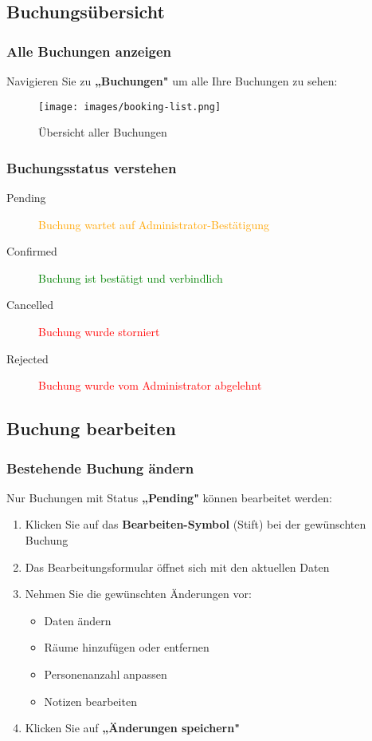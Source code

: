 \subsection{Buchungsübersicht}

\subsubsection{Alle Buchungen anzeigen}

Navigieren Sie zu \textbf{„Buchungen"} um alle Ihre Buchungen zu sehen:

\begin{figure}[H]
    \centering
    \texttt{[image: images/booking-list.png]}
    \caption{Übersicht aller Buchungen}
    \label{fig:booking-list}
\end{figure}

\subsubsection{Buchungsstatus verstehen}

\begin{description}
    \item[Pending] \textcolor{orange}{Buchung wartet auf Administrator-Bestätigung}
    \item[Confirmed] \textcolor{green}{Buchung ist bestätigt und verbindlich}
    \item[Cancelled] \textcolor{red}{Buchung wurde storniert}
    \item[Rejected] \textcolor{red}{Buchung wurde vom Administrator abgelehnt}
\end{description}

\subsection{Buchung bearbeiten}

\subsubsection{Bestehende Buchung ändern}

Nur Buchungen mit Status \textbf{„Pending"} können bearbeitet werden:

\begin{enumerate}
    \item Klicken Sie auf das \textbf{Bearbeiten-Symbol} (Stift) bei der gewünschten Buchung
    \item Das Bearbeitungsformular öffnet sich mit den aktuellen Daten
    \item Nehmen Sie die gewünschten Änderungen vor:
        \begin{itemize}
            \item Daten ändern
            \item Räume hinzufügen oder entfernen
            \item Personenanzahl anpassen
            \item Notizen bearbeiten
        \end{itemize}
    \item Klicken Sie auf \textbf{„Änderungen speichern"}
\end{enumerate}

